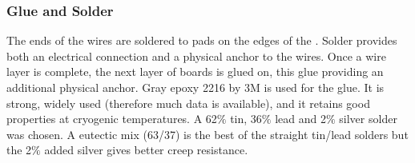 \subsubsection{Glue and Solder}
The ends of the wires are soldered to pads on the edges of the .  Solder provides both an electrical connection and a physical anchor to the wires. Once a wire layer is complete, the next layer of boards is glued on, this glue providing an additional physical anchor. Gray epoxy 2216 by 3M is used for the glue.  It is strong, widely used (therefore much data is available), and it retains good properties at cryogenic temperatures.  A 62$\%$ tin, 36$\%$ lead and 2$\%$ silver solder was chosen.  A eutectic mix (63/37) is the best of the straight tin/lead solders but the 2$\%$ added silver gives better creep resistance.

